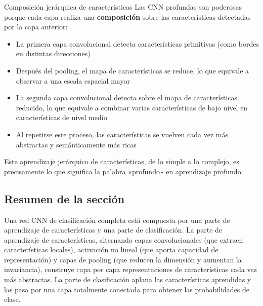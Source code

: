 \begin{knowledgebox}{Composición jerárquica de características}
Las CNN profundas son poderosas porque cada capa realiza una \textbf{composición} sobre las características detectadas por la capa anterior:
\begin{itemize}
    \item La primera capa convolucional detecta características primitivas (como bordes en distintas direcciones)
    \item Después del pooling, el mapa de características se reduce, lo que equivale a observar a una escala espacial mayor
    \item La segunda capa convolucional detecta sobre el mapa de características reducido, lo que equivale a combinar varias características de bajo nivel en características de nivel medio
    \item Al repetirse este proceso, las características se vuelven cada vez más abstractas y semánticamente más ricas
\end{itemize}
Este aprendizaje jerárquico de características, de lo simple a lo complejo, es precisamente lo que significa la palabra «profundo» en aprendizaje profundo.
\end{knowledgebox}

\subsection{Resumen de la sección}

Una red CNN de clasificación completa está compuesta por una parte de aprendizaje de características y una parte de clasificación. La parte de aprendizaje de características, alternando capas convolucionales (que extraen características locales), activación no lineal (que aporta capacidad de representación) y capas de pooling (que reducen la dimensión y aumentan la invariancia), construye capa por capa representaciones de características cada vez más abstractas. La parte de clasificación aplana las características aprendidas y las pasa por una capa totalmente conectada para obtener las probabilidades de clase.

\newpage
